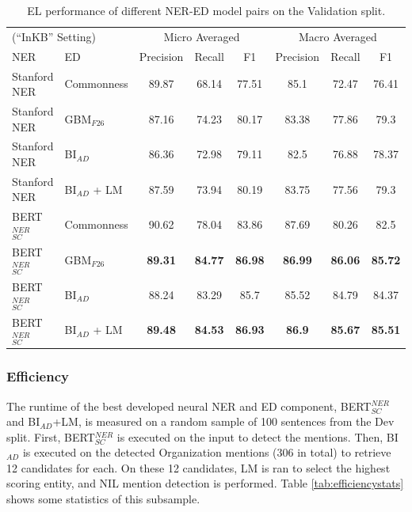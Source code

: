 \documentclass{report}
\theoremstyle{definition}
\theoremstyle{remark}
\begin{document}
\begin{table}[H]
    \vspace{0.5cm}\begin{tabular}{l l c c c| c c c}
    \multicolumn{2}{l}{(``InKB'' Setting)}&\multicolumn{3}{c|}{Micro Averaged}&\multicolumn{3}{c}{Macro Averaged} \\
    NER & ED &Precision&Recall&F1&Precision&Recall&F1\\
    \hline
    Stanford NER& Commonness & 89.87	&68.14&	77.51&	85.1	&72.47&	76.41\\
    Stanford NER& GBM$_{F26}$ & 87.16	&74.23&	80.17	&83.38	&77.86&	79.3\\
    Stanford NER & BI$_{AD}$ &86.36	&72.98&	79.11&	82.5	&76.88&	78.37\\
    Stanford NER &BI$_{AD}$ + LM &87.59&73.94&80.19&83.75&77.56&79.3\\ 
    BERT$_{SC}^{NER}$ & Commonness & 90.62	&78.04&	83.86	&87.69	&80.26&	82.5\\
    BERT$_{SC}^{NER}$ & GBM$_{F26}$ & \textbf{89.31}	&\textbf{84.77}&	\textbf{86.98}	&\textbf{86.99}	&\textbf{86.06}&	\textbf{85.72}\\
    BERT$_{SC}^{NER}$ & BI$_{AD}$ &88.24	&83.29&	85.7	&85.52	&84.79&	84.37\\
    BERT$_{SC}^{NER}$ & BI$_{AD}$ + LM &\textbf{89.48}&\textbf{84.53}&\textbf{86.93}&\textbf{86.9}&\textbf{85.67}&\textbf{85.51}\\
    \end{tabular}
    \caption{EL performance of different NER-ED model pairs on the Validation split. }
    \label{tab:elresultsvalid}
\end{table}


\subsubsection{Efficiency}
The runtime of the best developed neural NER and ED component, BERT$_{SC}^{NER}$ and  BI$_{AD}$+LM, is measured on a random sample of 100 sentences from the Dev split. First, BERT$_{SC}^{NER}$ is executed on the input to detect the mentions. Then, BI$_{AD}$ is executed on the detected Organization mentions (306 in total) to retrieve 12 candidates for each. On these 12 candidates, LM is ran to select the highest scoring entity, and NIL mention detection is performed. Table \ref{tab:efficiencystats} shows some statistics of this subsample. 
\end{document}
